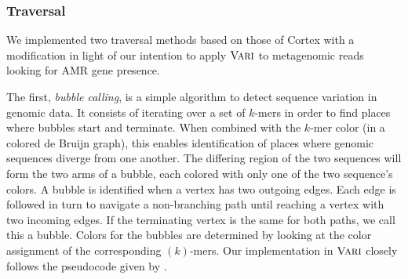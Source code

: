%
%

\subsubsection{Traversal}
We implemented two traversal methods based on those of {\sc Cortex} with a modification in light of our intention to apply $\mbox{\rm {\sc Vari}}$ to metagenomic reads looking for AMR gene presence.

The first, {\it bubble calling}, is a simple algorithm to detect sequence variation in genomic data. It consists of iterating over a set of $k$-mers in order to find places where bubbles start and terminate.  When combined with the $k$-mer color (in a colored de Bruijn graph), this enables identification of places where genomic sequences diverge from one another.  The differing region of the two sequences will form the two arms of a bubble, each colored with only one of the two sequence's colors.  A bubble is identified when a vertex has two outgoing edges. Each edge is followed in turn to navigate a non-branching path until reaching a vertex with two incoming edges. If the terminating vertex is the same for both paths, we call this a bubble. Colors for the bubbles are determined by looking at the color assignment of the corresponding $(k)$-mers. Our implementation in $\mbox{\rm {\sc Vari}}$ closely follows the pseudocode given by \cite{ICTFM12}.



